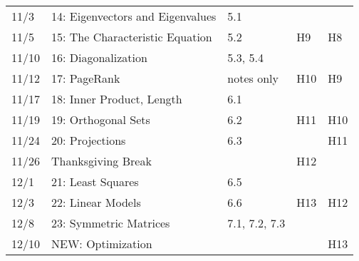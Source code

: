 \documentclass[11pt]{article}
\begin{document}
\begin{centering}
\begin{tabular}{||l|p{3in}|l|l|l||}
11/3 & 14: Eigenvectors and Eigenvalues  &  5.1 &  &\\ 
11/5 & 15: The Characteristic Equation  & 5.2 & H9 & H8\\ 
\hline

11/10 & 16: Diagonalization  & 5.3, 5.4 &  &\\  %
11/12 & 17: PageRank  & notes only & H10 & H9\\
\hline

11/17 & 18: Inner Product, Length  & 6.1 & &\\ 
11/19 & 19: Orthogonal Sets  & 6.2 & H11 & H10\\ 
 \hline

11/24 &20: Projections  & 6.3 &  &{\color{red}H11} \\ 
11/26 & Thanksgiving Break &&H12 &\\
\hline 

12/1 & 21: Least Squares  & 6.5 & & \\ 
12/3 & 22: Linear Models  & 6.6 &  H13 &H12\\ 
\hline  
 12/8 & 23: Symmetric Matrices  &7.1, 7.2, 7.3&&\\
12/10 & NEW: Optimization  &  &  &H13\\ 
\hline\hline


\end{tabular}\\
\end{centering}
\end{document}
